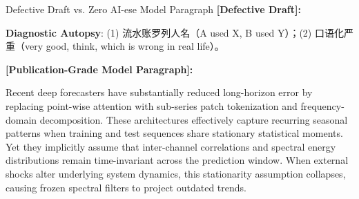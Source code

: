 \begin{ExampleBox}{Defective Draft vs. Zero AI-ese Model Paragraph}
\textbf{\color{TargetHighlight}[Defective Draft]:}\par
{}\par\vspace{4pt}
\textbf{Diagnostic Autopsy}: (1)  流水账罗列人名（A used X, B used Y）；(2)  口语化严重（very good, think, which is wrong in real life）。\par\vspace{6pt}
\textbf{\color{AcadNavy}[Publication-Grade Model Paragraph]:}\par
Recent deep forecasters have substantially reduced long-horizon error by replacing point-wise attention with sub-series patch tokenization and frequency-domain decomposition. These architectures effectively capture recurring seasonal patterns when training and test sequences share stationary statistical moments. Yet they implicitly assume that inter-channel correlations and spectral energy distributions remain time-invariant across the prediction window. When external shocks alter underlying system dynamics, this stationarity assumption collapses, causing frozen spectral filters to project outdated trends.
\end{ExampleBox}
